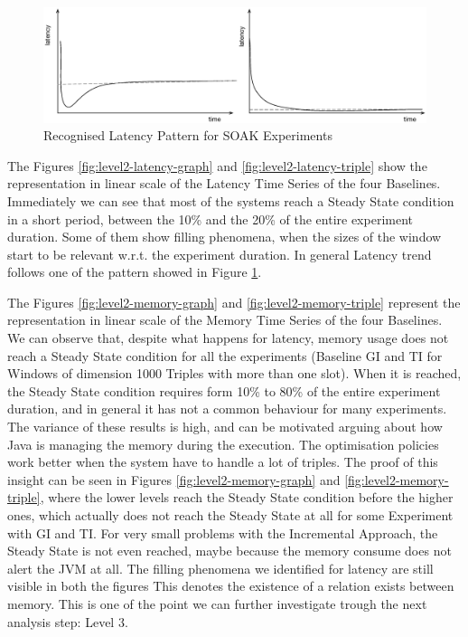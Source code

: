 \begin{figure}[hbt]
  \centering
	\includegraphics[width=\linewidth]{images/level2-pattern}
	\caption{Recognised Latency Pattern for SOAK Experiments} 
  	\label{fig:level2-pattern}
\end{figure}

The Figures \ref{fig:level2-latency-graph} and \ref{fig:level2-latency-triple} show the representation in linear scale of the Latency Time Series of the four Baselines. Immediately we can see that most of the systems reach a Steady State condition in a short period, between the 10\% and the 20\% of the entire experiment duration. Some of them show filling phenomena, when the sizes of the window start to be relevant w.r.t. the experiment duration. In general Latency trend follows one of the pattern showed in Figure \ref{fig:level2-pattern}. %

The Figures \ref{fig:level2-memory-graph} and \ref{fig:level2-memory-triple} represent the  representation in linear scale of the Memory Time Series of the four Baselines. We can observe that, despite what happens for latency, memory usage does not reach a Steady State condition for all the experiments (Baseline GI and TI for Windows of dimension 1000 Triples with more than one slot).  When it is reached, the Steady State condition requires form 10\% to 80\% of the entire experiment duration, and in general it has not a common behaviour for many experiments. The variance of these results is high, and can be motivated arguing about how Java is managing the memory during the execution. The optimisation policies work better when the system have to handle a lot of triples. The proof of this insight can be seen in Figures \ref{fig:level2-memory-graph} and \ref{fig:level2-memory-triple}, where the lower levels reach the Steady State condition before the higher ones, which actually does not reach the Steady State at all for some Experiment with GI and TI.  For very small problems with the Incremental Approach, the Steady State is not even reached, maybe because the memory consume does not alert the JVM at all. 
The filling phenomena we identified for latency are still visible in both the figures This denotes the existence of a relation exists between memory. This is one of the point we can further investigate trough the next analysis step: Level 3.

